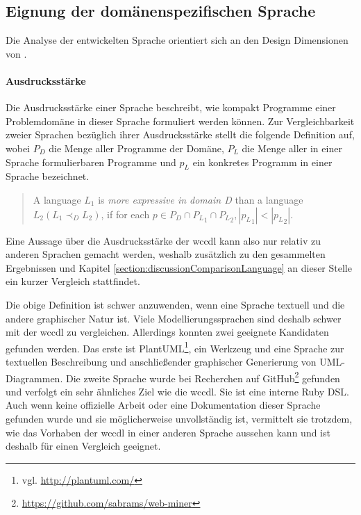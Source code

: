 \subsection{Eignung der domänenspezifischen Sprache}
    Die Analyse der entwickelten Sprache orientiert sich
    an den Design Dimensionen von \cite{voelter:DslEngineering}.

    \paragraph{Ausdrucksstärke}
    Die Ausdrucksstärke einer Sprache beschreibt,
    wie kompakt Programme einer Problemdomäne in dieser Sprache
    formuliert werden können.
    Zur Vergleichbarkeit zweier Sprachen bezüglich ihrer Ausdrucksstärke
    stellt \citet[Kapitel 4.1]{voelter:DslEngineering} die folgende
    Definition auf, wobei
    $P_D$ die Menge aller Programme der Domäne,
    $P_L$ die Menge aller in einer Sprache formulierbaren Programme und
    $p_L$ ein konkretes Programm in einer Sprache bezeichnet.

    \begin{quote}
        A language $L_1$ is \textit{more expressive in domain D}
        than a language $L_2 (L_1 {\prec}_D L_2)$,
        if for each $p \in P_D \cap {P_L}_1 \cap {P_L}_2, |{p_L}_1| < |{p_L}_2|$.
    \end{quote}

    Eine Aussage über die Ausdrucksstärke der \gls{wccdl} kann also
    nur relativ zu anderen Sprachen gemacht werden,
    weshalb zusätzlich zu den gesammelten Ergebnissen und
    Kapitel \ref{section:discussionComparisonLanguage}
    an dieser Stelle ein kurzer Vergleich stattfindet.

    Die obige Definition ist schwer anzuwenden,
    wenn eine Sprache textuell und die andere graphischer Natur ist.
    Viele Modellierungssprachen sind deshalb schwer mit der \gls{wccdl} zu vergleichen.
    Allerdings konnten zwei geeignete Kandidaten gefunden werden.
    Das erste ist PlantUML\footnote{vgl. \url{http://plantuml.com/}},
    ein Werkzeug und eine Sprache zur textuellen Beschreibung und anschließender
    graphischer Generierung von UML-Diagrammen.
    Die zweite Sprache wurde bei Recherchen auf
    GitHub\footnote{\url{https://github.com/sabrams/web-miner}} gefunden
    und verfolgt ein sehr ähnliches Ziel wie die \gls{wccdl}.
    Sie ist eine interne Ruby DSL.
    Auch wenn keine offizielle Arbeit oder eine Dokumentation dieser Sprache
    gefunden wurde und sie möglicherweise unvollständig ist,
    vermittelt sie trotzdem, wie das Vorhaben der \gls{wccdl}
    in einer anderen Sprache aussehen kann und ist deshalb für einen
    Vergleich geeignet.


